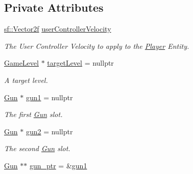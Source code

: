 \subsection*{Private Attributes}
\begin{DoxyCompactItemize}
\item 
\mbox{\label{class_player_ac9713635dbd1219b3969bf4e8116e357}} 
\mbox{\hyperlink{classsf_1_1_vector2}{sf\+::\+Vector2f}} \mbox{\hyperlink{class_player_ac9713635dbd1219b3969bf4e8116e357}{user\+Controller\+Velocity}}
\begin{DoxyCompactList}\small\item\em The User Controller Velocity to apply to the \mbox{\hyperlink{class_player}{Player}} Entity. \end{DoxyCompactList}\item 
\mbox{\hyperlink{class_game_level}{Game\+Level}} $\ast$ \mbox{\hyperlink{class_player_a8df46a73780f0f4109a1b89f46c83358}{target\+Level}} = nullptr
\begin{DoxyCompactList}\small\item\em A target level. \end{DoxyCompactList}\item 
\mbox{\label{class_player_a619e006b6de07f3ede26652d65e50844}} 
\mbox{\hyperlink{class_gun}{Gun}} $\ast$ \mbox{\hyperlink{class_player_a619e006b6de07f3ede26652d65e50844}{gun1}} = nullptr
\begin{DoxyCompactList}\small\item\em The first \mbox{\hyperlink{class_gun}{Gun}} slot. \end{DoxyCompactList}\item 
\mbox{\label{class_player_af430d5a087c9fcddb43fdc7daa1a5e8a}} 
\mbox{\hyperlink{class_gun}{Gun}} $\ast$ \mbox{\hyperlink{class_player_af430d5a087c9fcddb43fdc7daa1a5e8a}{gun2}} = nullptr
\begin{DoxyCompactList}\small\item\em The second \mbox{\hyperlink{class_gun}{Gun}} slot. \end{DoxyCompactList}\item 
\mbox{\label{class_player_ae6eb1ed5b84c017a6561528a7b81e875}} 
\mbox{\hyperlink{class_gun}{Gun}} $\ast$$\ast$ \mbox{\hyperlink{class_player_ae6eb1ed5b84c017a6561528a7b81e875}{gun\+\_\+ptr}} = \&\mbox{\hyperlink{class_player_a619e006b6de07f3ede26652d65e50844}{gun1}}
$$
\end{DoxyCompactItemize}
